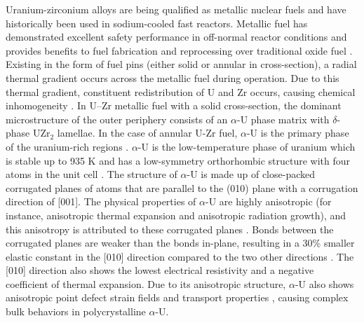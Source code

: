\documentclass[review]{elsarticle}
\begin{document}
\par Uranium-zirconium alloys are being qualified as metallic nuclear fuels and have historically been used in sodium-cooled fast reactors. Metallic fuel has demonstrated excellent safety performance in off-normal reactor conditions and provides benefits to fuel fabrication and reprocessing over traditional oxide fuel \cite{hofman1997}. Existing in the form of fuel pins (either solid or annular in cross-section), a radial thermal gradient occurs across the metallic fuel during operation. Due to this thermal gradient, constituent redistribution of U and Zr occurs, causing chemical inhomogeneity \cite{WILLIAMS2020107016}. In U–Zr metallic fuel with a solid cross-section, the dominant microstructure of the outer periphery consists of an $\alpha$-U phase matrix \cite{1993_Rest} with $\delta$-phase UZr$_2$ lamellae. In the case of annular U-Zr fuel, $\alpha$-U is the primary phase of the uranium-rich regions \cite{YAO2020152536, THOMAS2023154443}. $\alpha$-U is the low-temperature phase of uranium which is stable up to 935 K \cite{hofman1996} and has a low-symmetry orthorhombic structure with four atoms in the unit cell \cite{beeler2013}. The structure of $\alpha$-U is made up of close-packed corrugated planes of atoms that are parallel to the (010) plane with a corrugation direction of [001]. The physical properties of $\alpha$-U are highly anisotropic (for instance, anisotropic thermal expansion and anisotropic radiation growth), and this anisotropy is attributed to these corrugated planes \cite{ma15124106}. Bonds between the corrugated planes are weaker than the bonds in-plane, resulting in a 30\% smaller elastic constant in the [010] direction compared to the two other directions \cite{ma15124106}. The [010] direction also shows the lowest electrical resistivity and a negative coefficient of thermal expansion. Due to its anisotropic structure, $\alpha$-U also shows anisotropic point defect strain fields and transport properties \cite{MAHBUBA2021153072,Huang_2011,beeler2010,henley2014advances,beeler_mahbuba_wang_jokisaari_2021}, causing complex bulk behaviors in polycrystalline $\alpha$-U. 
\end{document}
